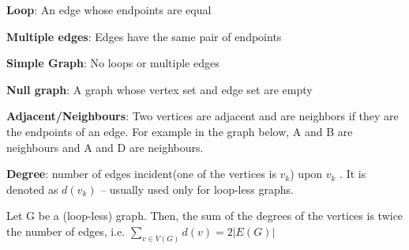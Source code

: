 \documentclass{article}
\theoremstyle{definition}
\theoremstyle{definition}
\newenvironment{manualprop}[1]{%
  \renewcommand\themanualpropinner{#1}%
  \manualpropinner
}{\endmanualpropinner}
\theoremstyle{named}
\begin{document}
\begin{compactitem}
    \item \textbf{{Loop}}: An edge whose endpoints are equal
    
    \item \textbf{{Multiple edges}}: Edges have the same pair of endpoints
    
    \item \textbf{{Simple Graph}}: No loops or multiple edges

    \item \textbf{{Null graph}}: A graph whose vertex set and edge set are empty

    \item  \textbf{{Adjacent/Neighbours}}: Two vertices are adjacent and are neighbors if they are the endpoints of an edge. For example in the graph below, A and B are neighbours and A and D are neighbours.

    \item \textbf{Degree}: number of edges
incident(one of the vertices is $v_k$) upon $v_k$ . It is denoted as $d(v_k)$ –
usually used only for loop-less graphs.

\end{compactitem}

\begin{center}
\end{center}

\begin{manualprop}{30}
    Let G be a (loop-less) graph. Then, the
sum of the degrees of the vertices is twice the number of
edges, i.e. $\sum_{v \in V(G)}^{} d(v) = 2 |E(G)|$
\end{manualprop}
\end{document}
